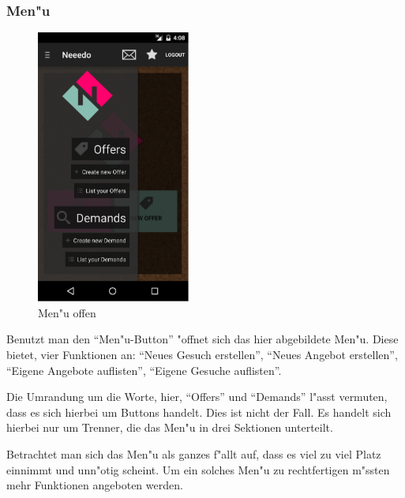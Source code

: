 \subsubsection{Men"u}
\begin{figure}[h]
\begin{center}
\includegraphics[width=0.45\textwidth]{./Bilder/menu.png}
\caption{Men"u offen}
\label{fig:menu}
\end{center}
\end{figure}

Benutzt man den \enquote{Men"u-Button} "offnet sich das hier abgebildete Men"u.
Diese bietet, vier Funktionen an: \enquote{Neues Gesuch erstellen}, \enquote{Neues Angebot erstellen}, \enquote{Eigene Angebote auflisten}, \enquote{Eigene Gesuche auflisten}.

Die Umrandung um die Worte, hier, \enquote{Offers} und \enquote{Demands} l"asst vermuten, dass es sich hierbei um Buttons handelt. 
Dies ist nicht der Fall. 
Es handelt sich hierbei nur um Trenner, die das Men"u in drei Sektionen unterteilt. 

Betrachtet man sich das Men"u als ganzes f"allt auf, dass es viel zu viel Platz einnimmt und unn"otig scheint. 
Um ein solches Men"u zu rechtfertigen m"ssten mehr Funktionen angeboten werden. 

